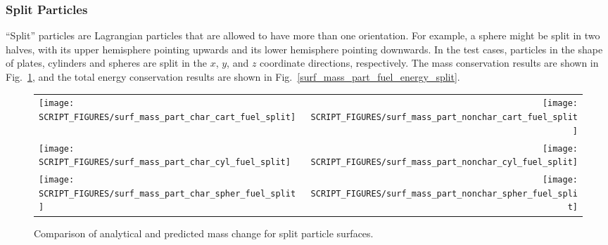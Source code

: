 \documentclass[11pt]{book}
\begin{document}
\subsubsection{Split Particles}
\label{surf_mass_part_char_cart_fuel_split}
\label{surf_mass_part_nonchar_cart_fuel_split}
\label{surf_mass_part_char_cyl_fuel_split}
\label{surf_mass_part_nonchar_cyl_fuel_split}
\label{surf_mass_part_char_spher_fuel_split}
\label{surf_mass_part_nonchar_spher_fuel_split}
\label{surf_mass_part_char_cart_fuel_energy_split}
\label{surf_mass_part_nonchar_cart_fuel_energy_split}
\label{surf_mass_part_char_cyl_fuel_energy_split}
\label{surf_mass_part_nonchar_cyl_fuel_energy_split}
\label{surf_mass_part_char_spher_fuel_energy_split}
\label{surf_mass_part_nonchar_spher_fuel_energy_split}

``Split'' particles are Lagrangian particles that are allowed to have more than one orientation. For example, a sphere might be split in two halves, with its upper hemisphere pointing upwards and its lower hemisphere pointing downwards. In the test cases, particles in the shape of plates, cylinders and spheres are split in the $x$, $y$, and $z$ coordinate directions, respectively. The mass conservation results are shown in Fig.~\ref{surf_mass_part_fuel_split}, and the total energy conservation results are shown in Fig.~\ref{surf_mass_part_fuel_energy_split}.

\begin{figure}[!htb]
\begin{tabular*}{\textwidth}{l@{\extracolsep{\fill}}r}
\texttt{[image: SCRIPT\_FIGURES/surf\_mass\_part\_char\_cart\_fuel\_split]} &
\texttt{[image: SCRIPT\_FIGURES/surf\_mass\_part\_nonchar\_cart\_fuel\_split]} \\
\texttt{[image: SCRIPT\_FIGURES/surf\_mass\_part\_char\_cyl\_fuel\_split]} &
\texttt{[image: SCRIPT\_FIGURES/surf\_mass\_part\_nonchar\_cyl\_fuel\_split]} \\
\texttt{[image: SCRIPT\_FIGURES/surf\_mass\_part\_char\_spher\_fuel\_split]} &
\texttt{[image: SCRIPT\_FIGURES/surf\_mass\_part\_nonchar\_spher\_fuel\_split]}
\end{tabular*}
\caption[The  test cases, mass conservation]{Comparison of analytical and predicted mass change for split particle surfaces.}
\label{surf_mass_part_fuel_split}
\end{figure}
\end{document}
